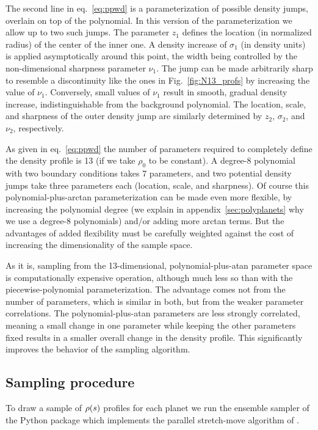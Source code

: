 The second line in eq.~\eqref{eq:ppwd} is a parameterization of possible density
jumps, overlain on top of the polynomial. In this version of the
parameterization we allow up to two such jumps. The parameter $z_1$ defines the
location (in normalized radius) of the center of the inner one. A density
increase of $\sigma_1$ (in density units) is applied asymptotically around this
point, the width being controlled by the non-dimensional sharpness parameter
$\nu_1$. The jump can be made arbitrarily sharp to resemble a discontinuity like
the ones in Fig.~\ref{fig:N13_profs} by increasing the value of $\nu_1$.
Conversely, small values of $\nu_1$ result in smooth, gradual density increase,
indistinguishable from the background polynomial. The location, scale, and
sharpness of the outer density jump are similarly determined by $z_2$,
$\sigma_2$, and $\nu_2$, respectively.

As given in eq.~\eqref{eq:ppwd} the number of parameters required to completely
define the density profile is 13 (if we take $\rho_0$ to be constant). A
degree-8 polynomial with two boundary conditions takes 7 parameters, and two
potential density jumps take three parameters each (location, scale, and
sharpness). Of course this polynomial-plus-arctan parameterization can be made
even more flexible, by increasing the polynomial degree (we explain in
appendix~\ref{sec:polyplanets} why we use a degree-8 polynomials) and/or adding
more arctan terms. But the advantages of added flexibility must be carefully
weighted against the cost of increasing the dimensionality of the sample space.

As it is, sampling from the 13-dimensional, polynomial-plus-atan parameter space
is computationally expensive operation, although much less so than with the
piecewise-polynomial parameterization. The advantage comes not from the number
of parameters, which is similar in both, but from the weaker parameter
correlations. The polynomial-plus-atan parameters are less strongly correlated,
meaning a small change in one parameter while keeping the other parameters fixed
results in a smaller overall change in the density profile. This significantly
improves the behavior of the sampling algorithm.

\subsection{Sampling procedure}\label{sec:mcmc}
To draw a sample of $\rho(s)$ profiles for each planet we run the ensemble
sampler of the  Python package \citep{Foreman-Mackey2013} which
implements the parallel stretch-move algorithm of \citet{Goodman2010}.